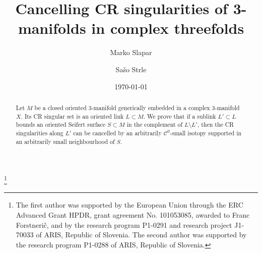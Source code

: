 \documentclass[12pt]{amsart}
\theoremstyle{definition}
\newcommand{\cC}{\mathcal{C}}
\numberwithin{equation}{section}
\begin{document}
\title[Cancelling CR singularities of $3$-manifolds in complex threefolds]
{Cancelling CR singularities of 3-manifolds in complex threefolds}
\author[Marko Slapar]{Marko Slapar}
\address{Marko Slapar, Faculty of Mathematics and Physics\\ University of Ljubljana \\ Jadranska 19\\1000 Ljubljana, Slovenia\\ \newline
Faculty of Education\\ University of Ljubljana \\ Kardeljeva plo\v{s}\v{c}ad 16\\1000 Ljubljana, Slovenia\\
and\newline
  Institute of Mathematics, Physics and Mechanics\\Jadranska
  19\\1000 Ljubljana, Slovenia}

\author[Sa\v{s}o Strle]{Sa\v{s}o Strle}
\address{Sa\v{s}o Strle, Faculty of Mathematics and Physics \\ University of Ljubljana \\ Jadranska 21 \\ 1000 Ljubljana, Slovenia }
\date{\today}


%
%
\thanks{The first author was supported by the European Union through the ERC Advanced Grant HPDR, grant agreement No. 101053085, 
awarded to Franc Forstneri\v{c}, and by the research program P1-0291 and research project J1-70033 of ARIS, Republic of Slovenia.
The second author was supported by the research program P1-0288 of ARIS, Republic of Slovenia.}


\begin{abstract}
Let $M$ be a closed oriented $3$-manifold generically embedded in a complex $3$-manifold $X$. Its CR singular set is an 
oriented link $L\subset M$. We prove that if a sublink $L'\subset L$ bounds an oriented Seifert surface $S\subset M$ 
in the complement of $L\setminus L'$, then the CR singularities along $L'$ can be cancelled by an arbitrarily 
$\cC^0$-small isotopy supported in an arbitrarily small neighbourhood of $S$.\end{abstract}
\maketitle
\end{document}

